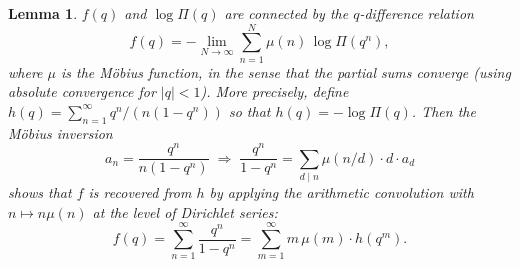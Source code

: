 \documentclass[12pt]{amsart}
\newtheorem{lemma}[theorem]{Lemma}
\theoremstyle{definition}
\theoremstyle{remark}
\begin{document}
\begin{lemma}\label{lem:qdiff}
$f(q)$ and $\log\Pi(q)$ are connected by the $q$-difference relation
\begin{equation}\label{eq:bridge}
  f(q) = -\lim_{N\to\infty}
  \sum_{n=1}^{N}\mu(n)\,\log\Pi(q^n),
\end{equation}
where $\mu$ is the M\"obius function, in the sense that the partial
sums converge (using absolute convergence for $|q|<1$). More
precisely, define $h(q)=\sum_{n=1}^{\infty}q^n/(n(1-q^n))$ so that
$h(q)=-\log\Pi(q)$. Then the M\"obius inversion
\[
  a_n = \frac{q^n}{n(1-q^n)} \;\Longrightarrow\;
  \frac{q^n}{1-q^n} = \sum_{d\mid n}\mu(n/d)\cdot d\cdot a_d
\]
shows that $f$ is recovered from $h$ by applying the arithmetic
convolution with $n\mapsto n\mu(n)$ at the level of Dirichlet
series:
\begin{equation}\label{eq:moebius}
  f(q) = \sum_{n=1}^{\infty}\frac{q^n}{1-q^n}
       = \sum_{m=1}^{\infty} m\,\mu(m)\cdot h(q^m).
\end{equation}
\end{lemma}
\end{document}
